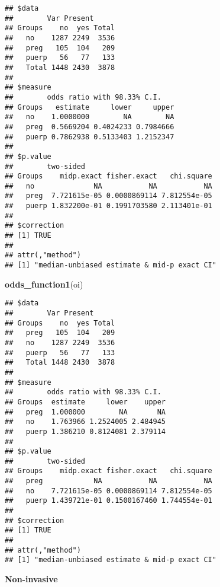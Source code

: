 \documentclass[
]{article}
\newenvironment{Shaded}{\begin{snugshade}}{\end{snugshade}}
\newcommand{\KeywordTok}[1]{\textcolor[rgb]{0.13,0.29,0.53}{\textbf{#1}}}
\newcommand{\NormalTok}[1]{#1}
\newcommand{\OperatorTok}[1]{\textcolor[rgb]{0.81,0.36,0.00}{\textbf{#1}}}
\newcommand{\StringTok}[1]{\textcolor[rgb]{0.31,0.60,0.02}{#1}}
\begin{document}
\begin{Shaded}
\end{Shaded}

\begin{verbatim}
## $data
##        Var Present
## Groups    no  yes Total
##   no    1287 2249  3536
##   preg   105  104   209
##   puerp   56   77   133
##   Total 1448 2430  3878
## 
## $measure
##        odds ratio with 98.33% C.I.
## Groups   estimate     lower     upper
##   no    1.0000000        NA        NA
##   preg  0.5669204 0.4024233 0.7984666
##   puerp 0.7862938 0.5133403 1.2152347
## 
## $p.value
##        two-sided
## Groups    midp.exact fisher.exact   chi.square
##   no              NA           NA           NA
##   preg  7.721615e-05 0.0000869114 7.812554e-05
##   puerp 1.832200e-01 0.1991703580 2.113401e-01
## 
## $correction
## [1] TRUE
## 
## attr(,"method")
## [1] "median-unbiased estimate & mid-p exact CI"
\end{verbatim}

\begin{Shaded}
\begin{Highlighting}[]
\KeywordTok{odds_function1}\NormalTok{(oi)}
\end{Highlighting}
\end{Shaded}

\begin{verbatim}
## $data
##        Var Present
## Groups    no  yes Total
##   preg   105  104   209
##   no    1287 2249  3536
##   puerp   56   77   133
##   Total 1448 2430  3878
## 
## $measure
##        odds ratio with 98.33% C.I.
## Groups  estimate     lower    upper
##   preg  1.000000        NA       NA
##   no    1.763966 1.2524005 2.484945
##   puerp 1.386210 0.8124081 2.379114
## 
## $p.value
##        two-sided
## Groups    midp.exact fisher.exact   chi.square
##   preg            NA           NA           NA
##   no    7.721615e-05 0.0000869114 7.812554e-05
##   puerp 1.439721e-01 0.1500167460 1.744554e-01
## 
## $correction
## [1] TRUE
## 
## attr(,"method")
## [1] "median-unbiased estimate & mid-p exact CI"
\end{verbatim}

\textbf{Non-invasive}

\begin{Shaded}
\end{Shaded}
\end{document}
